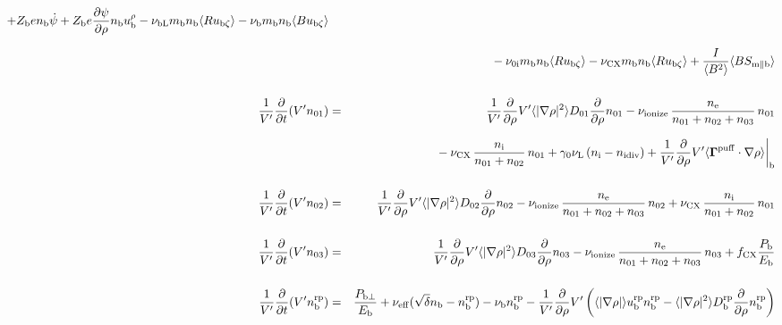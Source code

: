 \documentclass[11pt]{article}
\def\bvec#1{\leavevmode\hbox{\boldmath$#1$}}
\let\vec=\bvec
\def\r#1{{\rm#1}}
\def\aves#1{\langle#1\rangle}
\def\dd#1#2{\frac{\partial #1}{\partial #2}}
\def\para{\parallel}
\def\ddrho{\frac{\partial}{\partial\rho}}
\def\ddV{\frac{\partial}{\partial V}}
\def\ddt{\frac{\partial}{\partial t}}
\def\mi{m_\r{i}}
\def\mb{m_\r{b}}
\def\nee{n_\r{e}}
\def\ni{n_\r{i}}
\def\nb{n_\r{b}}
\def\Te{T_\r{e}}
\def\Zi{Z_\r{i}}
\def\Zb{Z_\r{b}}
\def\uzt#1{u_{\r{#1}\zeta}}
\def\upara#1{u_{\r{#1}\para}}
\def\qhatpara#1{\hat{q}_{\r{#1}\para}}
\def\urho#1{u_\r{#1}^\rho}
\def\De{D_\r{e}}
\def\nun#1{\nu_\r{0#1}}
\def\ndiv#1{n_\r{#1div}}
\def\nbrp{n_\r{b}^\r{rp}}
\def\ubrp{u_\r{b}^\r{rp}}
\def\Dbrp{D_\r{b}^\r{rp}}
\def\bri{\aves{B^2}\aves{R^2} - I^2}
\def\Pbperp{P_{\r{b}\perp}}
\def\Pb{P_\r{b}}
\def\Eb{E_\r{b}}
\def\nna{n_{01}}
\def\nnb{n_{02}}
\def\nnc{n_{03}}
\def\nueff{\nu_\r{eff}}
\def\fCX{f_\r{CX}}
\def\nuL{\nu_\r{L}}
\def\nuCX{\nu_\r{CX}}
\def\nuion{\nu_\r{ionize}}
\def\nub{\nu_\r{b}}
\def\nuOL{\nu_\r{OL}}
\def\nubL{\nu_\r{bL}}
\def\red#1{\textcolor{red}{#1}}
\begin{document}
\begin{eqnarray}
%
  + \Zb e              \nb \dot{\psi}
%
  + \Zb e \dd{\psi}{\rho} \nb \urho{b}
%
%
  - \nubL \mb \nb \aves{R \uzt{b}}
%
  - \nub  \mb \nb \aves{B \uzt{b}}
\nonumber\\[2.5mm]&&{}
%
  - \nun{i} \mb \nb \aves{R \uzt{b}}
%
  - \nuCX \mb \nb \aves{R \uzt{b}}
%
%
  + \frac{I}{\aves{B^2}} \aves{B S_{\r{m}\para\r{b}}}
%
\\[5mm]
  \frac{1}{V'} \ddt (V' \nna) &=& 
%
    \frac{1}{V'} \ddrho V' \aves{|\nabla\rho|^2} D_{01} \ddrho \nna
%
  - \nuion\, \frac{\nee}{\nna + \nnb + \nnc}\, \nna
%
\nonumber\\[2.5mm]&&{}
  - \nuCX\, \frac{\ni}{\nna + \nnb}\, \nna
%
  + \gamma_0 \nuL \, (\ni - \ndiv{i})
%
  + \frac{1}{V'} \ddrho V' \aves{\vec{\Gamma}^\r{puff}\cdot\nabla\rho}\biggr|_\r{b}
\\[5mm]
  \frac{1}{V'} \ddt (V' \nnb) &=& 
%
    \frac{1}{V'} \ddrho V' \aves{|\nabla\rho|^2} D_{02} \ddrho \nnb
%
  - \nuion\, \frac{\nee}{\nna + \nnb + \nnc}\, \nnb
%
  + \nuCX\, \frac{\ni}{\nna + \nnb}\, \nna
%
\\[5mm]
  \frac{1}{V'} \ddt (V' \nnc) &=& 
%
    \frac{1}{V'} \ddrho V' \aves{|\nabla\rho|^2} D_{03} \ddrho \nnc
%
  - \nuion\, \frac{\nee}{\nna + \nnb + \nnc}\, \nnc
%
  + \fCX \frac{\Pb}{\Eb}
\\[5mm]
  \frac{1}{V'} \ddt (V' \nbrp) &=&
%
    \frac{\Pbperp}{\Eb}
%
  + \nueff (\sqrt{\delta} \nb - \nbrp)
%
  - \nub \nbrp
%
  - \frac{1}{V'} \ddrho V' \left( \aves{|\nabla\rho|} \ubrp \nbrp - \aves{|\nabla\rho|^2} \Dbrp \ddrho \nbrp \right)
%
\end{eqnarray}
\end{document}
